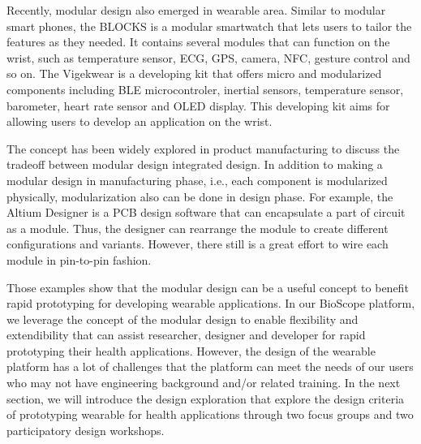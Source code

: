 Recently, modular design also emerged in wearable area.
Similar to modular smart phones, the BLOCKS \cite{BLOCKS} is a modular smartwatch that lets users to tailor the features as they needed. It contains several modules that can function on the wrist, such as temperature sensor, ECG, GPS, camera, NFC, gesture control and so on. 
The Vigekwear \cite{Vigekwear} is a developing kit that offers micro and modularized components including BLE microcontroler, inertial sensors, temperature sensor, barometer, heart rate sensor and OLED display.
This developing kit aims for allowing users to develop an application on the wrist.

The concept has been widely explored in product manufacturing to discuss the tradeoff between modular design integrated design\cite{schilling2000toward, ulrich1995role}. 
In addition to making a modular design in manufacturing phase, i.e., each component is modularized physically, modularization also can be done in design phase. For example, the Altium Designer \cite{AltiumDesigner} is a PCB design software that can encapsulate a part of circuit as a module. Thus, the designer can rearrange the module to create different configurations and variants. However, there still is a great effort to wire each module in pin-to-pin fashion.

Those examples show that the modular design can be a useful concept to benefit rapid prototyping for developing wearable applications. 
In our BioScope platform, we leverage the concept of the modular design to enable flexibility and extendibility that can assist researcher, designer and developer for rapid prototyping their health applications. However, the design of the wearable platform has a lot of challenges that the platform can meet the needs of our users who may not have engineering background and/or related training. In the next section, we will introduce the design exploration that explore the design criteria of prototyping wearable for health applications through two focus groups and two participatory design workshops.

